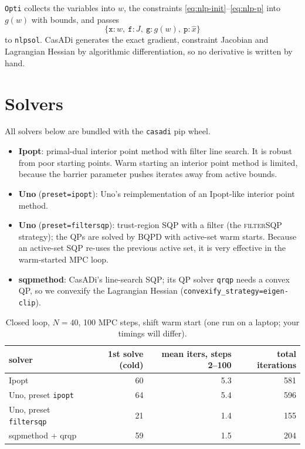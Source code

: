 \documentclass[11pt]{article}
\begin{document}
\texttt{Opti} collects the variables into $w$, the constraints
\eqref{eq:nlp-init}--\eqref{eq:nlp-p} into $g(w)$ with bounds, and passes \[
  \{\texttt{x}: w,\ \texttt{f}: J,\ \texttt{g}: g(w),\ \texttt{p}: \hat x\}
\]
to \texttt{nlpsol}. CasADi generates the exact gradient, constraint Jacobian and
Lagrangian Hessian by algorithmic differentiation, so no derivative is written by hand.

\section{Solvers}

All solvers below are bundled with the \texttt{casadi} pip wheel.
\begin{itemize}
\item \textbf{Ipopt}: primal-dual interior point method with filter line search. It is
  robust from poor starting points. Warm starting an interior point method is limited,
  because the barrier parameter pushes iterates away from active bounds.
\item \textbf{Uno} (\texttt{preset=ipopt}): Uno's reimplementation of an Ipopt-like
  interior point method.
\item \textbf{Uno} (\texttt{preset=filtersqp}): trust-region SQP with a filter
  (the \textsc{filterSQP} strategy); the QPs are solved by BQPD with active-set warm
  starts. Because an active-set SQP re-uses the previous active set, it is very
  effective in the warm-started MPC loop.
\item \textbf{sqpmethod}: CasADi's line-search SQP; its QP solver \texttt{qrqp} needs a
  convex QP, so we convexify the Lagrangian Hessian (\texttt{convexify\_strategy=eigen-clip}).
\end{itemize}

\begin{table}[ht]
\centering
\caption{Closed loop, $N=40$, 100 MPC steps, shift warm start (one run on a laptop;
your timings will differ).}\label{tab:solvers}
\begin{tabular}{lrrr}
\toprule
solver & 1st solve (cold) & mean iters, steps 2--100 & total iterations \\
\midrule
Ipopt                    & 60 & 5.3 & 581 \\
Uno, preset \texttt{ipopt}     & 64 & 5.4 & 596 \\
Uno, preset \texttt{filtersqp} & 21 & 1.4 & 155 \\
sqpmethod + qrqp         & 59 & 1.5 & 204 \\
\bottomrule
\end{tabular}
\end{table}
\end{document}
